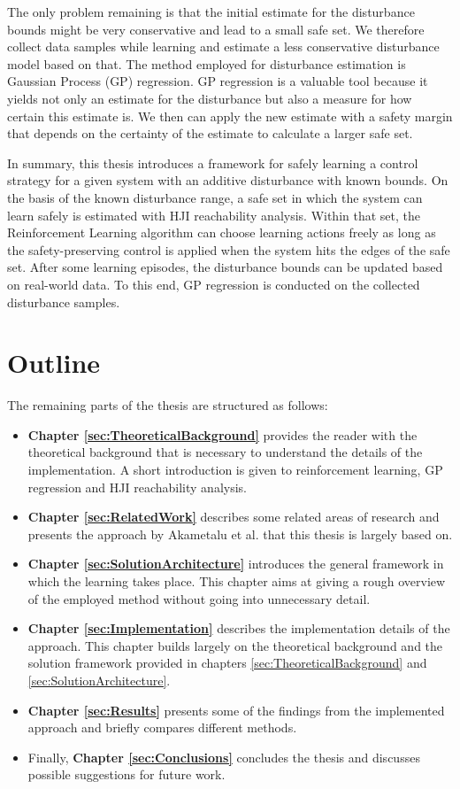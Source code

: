 \documentclass[../main.tex]{subfiles}
\begin{document}
The only problem remaining is that the initial estimate for the disturbance bounds might be very conservative and lead to a small safe set. We therefore collect data samples while learning and estimate a less conservative disturbance model based on that. The method employed for disturbance estimation is Gaussian Process (GP) regression. GP regression is a valuable tool because it yields not only an estimate for the disturbance but also a measure for how certain this estimate is. We then can apply the new estimate with a safety margin that depends on the certainty of the estimate to calculate a larger safe set.

In summary, this thesis introduces a framework for safely learning a control strategy for a given system with an additive disturbance with known bounds. On the basis of the known disturbance range, a safe set in which the system can learn safely is estimated with HJI reachability analysis. Within that set, the Reinforcement Learning algorithm can choose learning actions freely as long as the safety-preserving control is applied when the system hits the edges of the safe set. After some learning episodes, the disturbance bounds can be updated based on real-world data. To this end, GP regression is conducted on the collected disturbance samples. 

\section{Outline}
The remaining parts of the thesis are structured as follows:
\begin{itemize}
\item \textbf{Chapter \ref{sec:TheoreticalBackground}} provides the reader with the theoretical background that is necessary to understand the details of the implementation. A short introduction is given to reinforcement learning, GP regression and HJI reachability analysis.
\item \textbf{Chapter \ref{sec:RelatedWork}} describes some related areas of research and presents the approach by Akametalu et al. \cite{akametalu2014reachability} that this thesis is largely based on.
\item \textbf{Chapter \ref{sec:SolutionArchitecture}} introduces the general framework in which the learning takes place. This chapter aims at giving a rough overview of the employed method without going into unnecessary detail.
\item \textbf{Chapter \ref{sec:Implementation}} describes the implementation details of the approach. This chapter builds largely on the theoretical background and the solution framework provided in chapters \ref{sec:TheoreticalBackground} and \ref{sec:SolutionArchitecture}.
\item  \textbf{Chapter \ref{sec:Results}} presents some of the findings from the implemented approach and briefly compares different methods.
\item Finally, \textbf{Chapter \ref{sec:Conclusions}} concludes the thesis and discusses possible suggestions for future work.
\end{itemize}
\end{document}
